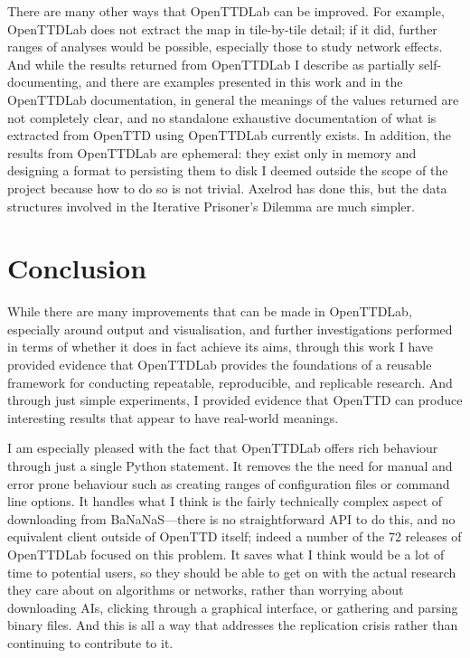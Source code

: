 \documentclass[logo,msc,dsti]{style/infthesis}    %
\begin{document}
{There are many other ways that OpenTTDLab can be improved. For example, OpenTTDLab does not extract the map in tile-by-tile detail; if it did, further ranges of analyses would be possible, especially those to study network effects. And while the results returned from OpenTTDLab I describe as partially self-documenting, and there are examples presented in this work and in the OpenTTDLab documentation, in general the meanings of the values returned are not completely clear, and no standalone exhaustive documentation of what is  extracted from OpenTTD using OpenTTDLab currently exists. In addition, the results from OpenTTDLab are ephemeral: they exist only in memory and designing a format to persisting them to disk I deemed outside the scope of the project because how to do so is not trivial. Axelrod has done this, but the data structures involved in the Iterative Prisoner's Dilemma are much simpler.


\chapter{Conclusion}
\label{chapter:conclusion}

While there are many improvements that can be made in OpenTTDLab, especially around output and visualisation, and further investigations performed in terms of whether it does in fact achieve its aims, through this work I have provided evidence that OpenTTDLab provides the foundations of a reusable framework for conducting repeatable, reproducible, and replicable research. And through just simple experiments, I provided evidence that OpenTTD can produce interesting results that appear to have real-world meanings. 

I am especially pleased with the fact that OpenTTDLab offers rich behaviour through just a single Python statement. It removes the the need for manual and error prone behaviour such as creating ranges of configuration files or command line options. It handles what I think is the fairly technically complex aspect of downloading from BaNaNaS---there is no straightforward API to do this, and no equivalent client outside of OpenTTD itself; indeed a number of the 72 releases of OpenTTDLab focused on this problem. It saves what I think would be a lot of time to potential users, so they should be able to get on with the actual research they care about on algorithms or networks, rather than worrying about downloading AIs, clicking through a graphical interface, or gathering and parsing binary files. And this is all a way that addresses the replication crisis rather than continuing to contribute to it.

}
\end{document}
